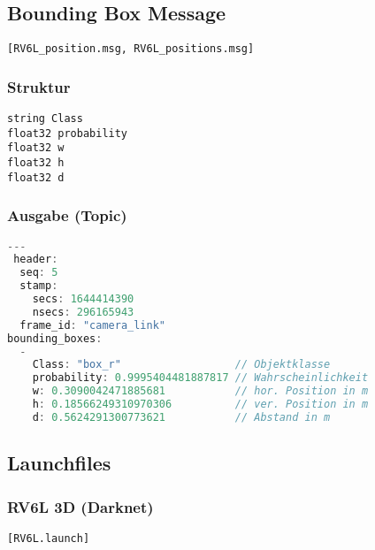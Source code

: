 \subsection{Bounding Box Message} \label{subsec:bounding_strukt}

\lstinline{[RV6L_position.msg, RV6L_positions.msg]}

\subsubsection{Struktur}

\begin{lstlisting}
string Class
float32 probability
float32 w
float32 h
float32 d
\end{lstlisting}

\subsubsection{Ausgabe (Topic)} 
\begin{lstlisting}[language=c]
---
 header: 
  seq: 5
  stamp: 
    secs: 1644414390
    nsecs: 296165943
  frame_id: "camera_link"
bounding_boxes: 
  - 
    Class: "box_r"                  // Objektklasse
    probability: 0.9995404481887817 // Wahrscheinlichkeit
    w: 0.3090042471885681           // hor. Position in m
    h: 0.18566249310970306          // ver. Position in m
    d: 0.5624291300773621           // Abstand in m
\end{lstlisting}

\subsection{Launchfiles} \label{subsec:bounding_launchfiles}

\subsubsection{RV6L 3D (Darknet)}

\lstinline{[RV6L.launch]}

